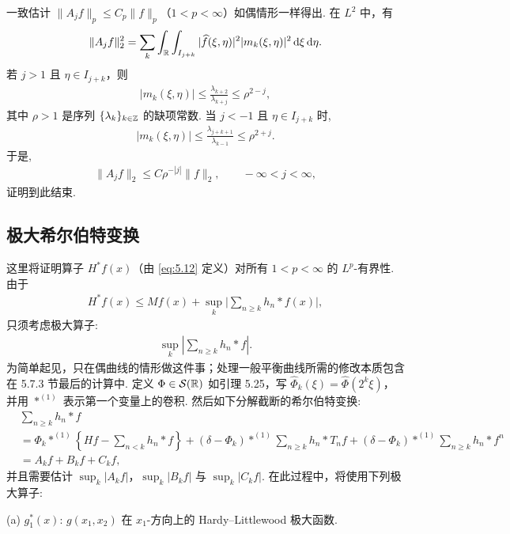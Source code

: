 一致估计 $\|A_j f\|_p \leq C_p \|f\|_p$（$1 < p < \infty$）如偶情形一样得出. 在 $L^2$ 中，有
\begin{align*}
  \|A_{j}f\|_{2}^{2}
  =\sum_{k}\int_{\mathbb{R}}\int_{I_{j+k}}|\widehat{f}(\xi,\eta)|^{2}|m_{k}(\xi,\eta)|^{2}\,\mathrm{d}\xi\,\mathrm{d}\eta.
\end{align*}
若 $j > 1$ 且 $\eta \in I_{j+k}$，则
\begin{align*}
  |m_{k}(\xi,\eta)|\leq\frac{\lambda_{k+2}}{\lambda_{k+j}}\leq\rho^{2-j},
\end{align*}
其中 $\rho > 1$ 是序列 $\{\lambda_k\}_{k \in \mathbb{Z}}$ 的缺项常数. 当 $j < -1$ 且 $\eta \in I_{j+k}$ 时,
\begin{align*}
  |m_{k}(\xi,\eta)|\leq\frac{\lambda_{j+k+1}}{\lambda_{k-1}}\leq\rho^{2+j}.
\end{align*}
于是,
\begin{align*}
  \|A_{j}f\|_{2}\leq C\rho^{-|j|}\|f\|_{2},\qquad -\infty<j<\infty,
\end{align*}
证明到此结束.

\subsection{极大希尔伯特变换}

这里将证明算子 $H^{*}f(x)$（由 \eqref{eq:5.12} 定义）对所有 $1 < p < \infty$ 的 $L^{p}$-有界性. 由于
\begin{align*}
  H^{*}f(x)\leq M f(x)+\sup_{k}\Big|\sum_{n\geq k}h_{n}*f(x)\Big|,
\end{align*}
只须考虑极大算子:
\begin{align*}
  \sup_{k}\left|\sum_{n\geq k}h_{n}*f\right|.
\end{align*}
为简单起见，只在偶曲线的情形做这件事；处理一般平衡曲线所需的修改本质包含在 5.7.3 节最后的计算中. 定义 $\Phi \in \mathcal{S}(\mathbb{R})$ 如引理 5.25，写 $\widehat{\Phi}_k(\xi) = \widehat{\Phi}(2^k\xi)$，并用 $*^{(1)}$ 表示第一个变量上的卷积. 然后如下分解截断的希尔伯特变换:
\begin{align*}
  &\sum_{n\geq k}h_{n}*f\\
  &=\Phi_{k}*^{(1)}\left\{H f-\sum_{n<k}h_{n}*f\right\}
   +\left(\delta-\Phi_{k}\right)*^{(1)}\sum_{n\geq k}h_{n}*T_{n}f
   +\left(\delta-\Phi_{k}\right)*^{(1)}\sum_{n\geq k}h_{n}*f^{n}\\
  &=A_{k}f+B_{k}f+C_{k}f,
\end{align*}
并且需要估计 $\sup_k |A_{k}f|$，$\sup_k |B_{k}f|$ 与 $\sup_k |C_{k}f|$. 在此过程中，将使用下列极大算子:

(a) $g_{1}^{*}(x)$: $g(x_{1}, x_{2})$ 在 $x_{1}$-方向上的 Hardy--Littlewood 极大函数.

